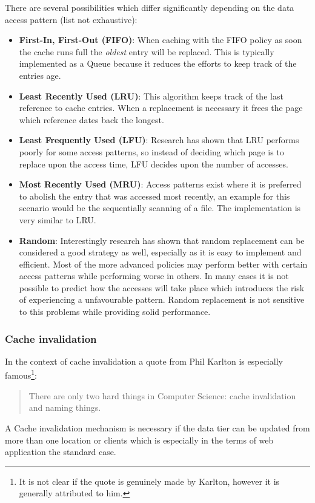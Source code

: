There are several possibilities which differ significantly depending on the data access pattern (list not exhaustive):
\begin{itemize}
	\item \textbf{First-In, First-Out (FIFO)}: When caching with the FIFO policy as soon the cache runs full the \emph{oldest} entry will be replaced. This is typically implemented as a Queue because it reduces the efforts to keep track of the entries age.
	\item \textbf{Least Recently Used (LRU)}: This algorithm keeps track of the last reference to cache entries. When a replacement is necessary it frees the page which reference dates back the longest. 
	\item \textbf{Least Frequently Used (LFU)}: Research has shown that LRU performs poorly for some access patterns, so instead of deciding which page is to replace upon the access time, LFU decides upon the number of accesses.
	\item \textbf{Most Recently Used (MRU)}: Access patterns exist where it is preferred to abolish the entry that was accessed most recently, an example for this scenario would be the sequentially scanning of a file. The implementation is very similar to LRU.
	\item \textbf{Random}: Interestingly research has shown that random replacement can be considered a good strategy as well, especially as it is easy to implement and efficient. Most of the more advanced policies may perform better with certain access patterns while performing worse in others. In many cases it is not possible to predict how the accesses will take place which introduces the risk of experiencing a unfavourable pattern. Random replacement is not sensitive to this problems while providing solid performance.
\end{itemize}

\subsubsection{Cache invalidation}
In the context of cache invalidation a quote from Phil Karlton is especially famous\footnote{It is not clear if the quote is genuinely made by Karlton, however it is generally attributed to him.}: 
\begin{quote}
There are only two hard things in Computer Science: cache invalidation and naming things.
\end{quote}

A Cache invalidation mechanism is necessary if the data tier can be updated from more than one location or clients which is especially in the terms of web application the standard case. 

